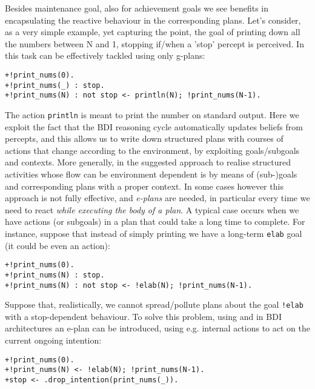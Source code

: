 %
%
%
Besides maintenance goal, also for achievement goals we see benefits in
encapsulating the reactive behaviour in the corresponding plans.
%
Let's consider, as a very simple example, yet capturing the point,  
the goal of printing down all the numbers between N and 1,
stopping if/when a 'stop' percept is perceived.
%
In {\asl} this task can be effectively tackled using only g-plans:
%
\begin{small}
\begin{verbatim}
+!print_nums(0).
+!print_nums(_) : stop.
+!print_nums(N) : not stop <- println(N); !print_nums(N-1).
\end{verbatim}
\end{small}
%
\noindent The action \texttt{println} is meant to print the number
on standard output.
%
Here we exploit the fact that the BDI reasoning cycle automatically 
updates beliefs from percepts, and this allows us to write down 
structured plans with courses of actions that change according 
to the environment, by exploiting goals/subgoals and contexts.
%
%
More generally, in {\asl} the suggested approach to realise
structured activities whose flow can be environment dependent is by
means of (sub-)goals and corresponding plans with a proper context.
%
In some cases however this approach is not fully effective, and
\emph{e-plans} are needed,
%
in particular every time we need to react \emph{while executing the
  body of a plan}.
%
A typical case occurs when we have actions (or subgoals) in a plan
that could take a long time to complete.
%
For instance, suppose that instead of simply printing we have a
long-term \texttt{elab} goal (it could be even an action):

\begin{small}
\begin{verbatim}
+!print_nums(0).
+!print_nums(N) : stop. 
+!print_nums(N) : not stop <- !elab(N); !print_nums(N-1).
\end{verbatim}
\end{small}

\noindent Suppose that, realistically, we cannot spread/pollute plans
about the goal \texttt{!elab} with a stop-dependent behaviour.
%
To solve this problem, using {\asl} and in BDI architectures
an e-plan can be introduced, using e.g. internal actions to act on the
current ongoing intention:

\begin{small}
\begin{verbatim}
+!print_nums(0).
+!print_nums(N) <- !elab(N); !print_nums(N-1).		
+stop <- .drop_intention(print_nums(_)).
\end{verbatim}
\end{small}


